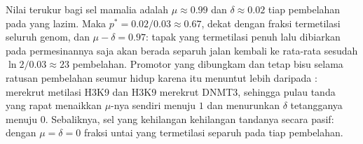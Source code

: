 \begin{example}\label{ex:b3:chromatin-epigenetics:maintenance-numbers}
Nilai terukur bagi sel mamalia adalah $\mu \approx 0.99$ dan
$\delta \approx 0.02$ tiap pembelahan pada  yang lazim. Maka $p^{*} =
0.02/0.03 \approx 0.67$, dekat dengan fraksi termetilasi seluruh genom, dan
$\mu - \delta = 0.97$: tapak yang termetilasi penuh lalu dibiarkan pada
permesinannya saja akan berada separuh jalan kembali ke rata-rata sesudah $\ln 2 /
0.03 \approx 23$ pembelahan. Promotor yang dibungkam dan tetap bisu
selama ratusan pembelahan seumur hidup karena itu menuntut lebih daripada
:   merekrut metilasi H3K9 dan  H3K9 merekrut
DNMT3, sehingga pulau tanda yang rapat menaikkan $\mu$-nya sendiri menuju $1$
dan menurunkan $\delta$ tetangganya menuju $0$. Sebaliknya, sel yang
kehilangan  kehilangan tandanya secara pasif: dengan
$\mu = \delta = 0$ fraksi untai yang termetilasi separuh pada tiap
pembelahan.
\end{example}

